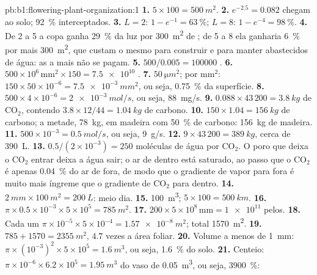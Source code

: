 \begin{solution}{pb:b1:flowering-plant-organization:1}
\textbf{1.} $5\times 100 = \qty{500}{m^2}$.
\textbf{2.} $e^{-2.5} = 0.082$ chegam ao solo; \qty{92}{\%}
interceptados.
\textbf{3.} $L = 2$: $1 - e^{-1} = \qty{63}{\%}$; $L = 8$: $1 -
e^{-4} = \qty{98}{\%}$.
\textbf{4.} De 2 a 5 a copa ganha \qty{29}{\%} da luz por
\qty{300}{m^2} de ; de 5 a 8 ela ganharia \qty{6}{\%} por mais
\qty{300}{m^2}, que custam o mesmo para construir e para manter
abastecidos de água: as  a mais não se pagam.
\textbf{5.} $500/0.005 = \num{100000}$ .
\textbf{6.} $500\times 10^6\,\mathrm{mm^2}\times 150 = \num{7.5e10}$
.
\textbf{7.} $\qty{50}{\micro m^2}$; por mm$^2$: $150\times 50\times
10^{-6} = \qty{7.5e-3}{mm^2}$, ou seja, \qty{0.75}{\%} da superfície.
\textbf{8.} $500\times 4\times 10^{-6} = \qty{2e-3}{mol/s}$, ou seja,
\qty{88}{mg/s}.
\textbf{9.} $0.088\times 43\,200 = \qty{3.8}{kg}$ de $\mathrm{CO_2}$,
contendo $3.8\times 12/44 = \qty{1.04}{kg}$ de carbono.
\textbf{10.} $150\times 1.04 = \qty{156}{kg}$ de carbono; a metade,
\qty{78}{kg}, em madeira com \qty{50}{\%} de carbono: \qty{156}{kg} de
madeira.
\textbf{11.} $500\times 10^{-3} = \qty{0.5}{mol/s}$, ou seja, \qty{9}{g/s}.
\textbf{12.} $9\times 43\,200 = \qty{389}{kg}$, cerca de \qty{390}{L}.
\textbf{13.} $0.5/(2\times 10^{-3}) = 250$ moléculas de água por
$\mathrm{CO_2}$. O poro que deixa o $\mathrm{CO_2}$ entrar deixa a água
sair; o ar de dentro está saturado, ao passo que o $\mathrm{CO_2}$ é
apenas \qty{0.04}{\%} do ar de fora, de modo que o gradiente de vapor
para fora é muito mais íngreme que o gradiente de $\mathrm{CO_2}$ para
dentro.
\textbf{14.} $\qty{2}{mm}\times\qty{100}{m^2} = \qty{200}{L}$: meio dia.
\textbf{15.} \qty{100}{m^3}; $5\times 100 = \qty{500}{km}$.
\textbf{16.} $\pi\times 0.5\times 10^{-3}\times 5\times 10^5 =
\qty{785}{m^2}$.
\textbf{17.} $200\times 5\times 10^8\,\mathrm{mm} = \num{1e11}$ pelos.
\textbf{18.} Cada um $\pi\times 10^{-5}\times 5\times 10^{-4} =
\qty{1.57e-8}{m^2}$; total \qty{1570}{m^2}.
\textbf{19.} $785 + 1570 = \qty{2355}{m^2}$, $4.7$ vezes a área foliar.
\textbf{20.} Volume a menos de \qty{1}{mm}: $\pi\times(10^{-3})^2\times 5
\times 10^5 = \qty{1.6}{m^3}$, ou seja, \qty{1.6}{\%} do solo.
\textbf{21.} Centeio: $\pi\times 10^{-6}\times 6.2\times 10^5 =
\qty{1.95}{m^3}$ do vaso de \qty{0.05}{m^3}, ou seja, \qty{3900}{\%}:

\end{solution}
